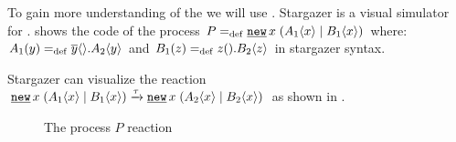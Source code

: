 To gain more understanding of the \picalc{} we will use \cite{stargazer}. Stargazer is a visual simulator for \picalc{}.  shows the code of the process $P\define\procres{x}{(\procpar{\proccall{A_1}{x}}{\proccall{B_1}{x}})}$ where: $A_1(y)=_{\mathrm{def}}{}\overline{y}\langle{}\rangle.A_2\langle y\rangle$ and $B_1(z)=_{\mathrm{def}}{}z({}).B_2\langle z\rangle$ in stargazer syntax.

\raggedbottom

Stargazer can visualize the reaction $\procres{x}{(\procpar{\proccall{A_1}{x}}{\proccall{B_1}{x}})} \transs{\tau} \procres{x}{(\procpar{\proccall{A_2}{x}}{\proccall{B_2}{x}})}$ as shown in
.
\begin{figure}[H]%
\centering
{}%
\hfill
{}%
\caption{The process $P$ reaction}
\label{pi_visualization_stargazer_reaction}%
\end{figure}